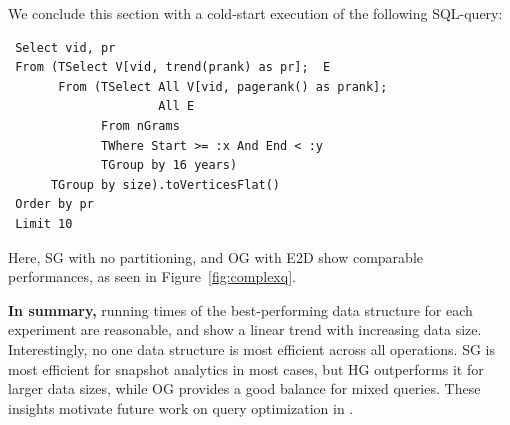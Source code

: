 
We conclude this section with a cold-start execution of
the following SQL-\ql query:

\begin{small}
\begin{verbatim}
 Select vid, pr
 From (TSelect V[vid, trend(prank) as pr];  E
       From (TSelect All V[vid, pagerank() as prank]; 
                     All E
             From nGrams
             TWhere Start >= :x And End < :y
             TGroup by 16 years)
      TGroup by size).toVerticesFlat()
 Order by pr
 Limit 10
\end{verbatim}
\end{small}


Here, SG with no partitioning, and OG with E2D show comparable
performances, as seen in Figure~\ref{fig:complexq}.


{\bf In summary,} running times of the best-performing data structure
for each experiment are reasonable, and show a linear trend with
increasing data size.  Interestingly, no one data structure is most
efficient across all operations.    SG is most efficient for snapshot
analytics in most cases, but HG outperforms it for larger data sizes,
while OG provides a good balance for mixed queries.  These insights
motivate future work on query optimization in \ql.
